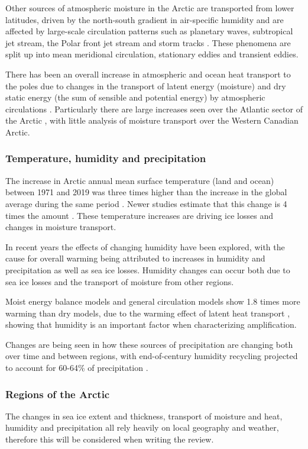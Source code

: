 \documentclass[11pt, oneside]{article}
\begin{document}
Other sources of atmospheric moisture in the Arctic are transported from lower latitudes, driven by the north-south gradient in air-specific humidity and are affected by large-scale circulation patterns such as planetary waves, subtropical jet stream, the Polar front jet stream and storm tracks \cite{gimeno2019atmospheric}. These phenomena are split up into mean meridional circulation, stationary eddies and transient eddies. 

There has been an overall increase in atmospheric and ocean heat transport to the poles due to changes in the transport of latent energy (moisture) and dry static energy (the sum of sensible and potential energy) by atmospheric circulations \cite{mcgraw2020changes}. Particularly there are large increases seen over the Atlantic sector of the Arctic \cite{dufour2016atmospheric}, with little analysis of moisture transport over the Western Canadian Arctic. 

\subsubsection{Temperature, humidity and precipitation} 
The increase in Arctic annual mean surface temperature (land and ocean) between 1971 and 2019 was three times higher than the increase in the global average during the same period \cite{AMAP}. Newer studies estimate that this change is 4 times the amount \cite{rantanen2022arctic}. These temperature increases are driving ice losses and changes in moisture transport.

In recent years the effects of changing humidity have been explored, with the cause for overall warming being attributed to increases in humidity and precipitation \cite{mccrystall2021new} as well as sea ice losses. Humidity changes can occur both due to sea ice losses and the transport of moisture from other regions. 

Moist energy balance models and general circulation models show 1.8 times more warming than dry models, due to the warming effect of latent heat transport \cite{feldl2021polar}, showing that humidity is an important factor when characterizing amplification.

Changes are being seen in how these sources of precipitation are changing both over time and between regions, with end-of-century humidity recycling projected to account for 60-64\% of precipitation \cite{ford2022arctic}.

\subsubsection{Regions of the Arctic }
The changes in sea ice extent and thickness, transport of moisture and heat, humidity and precipitation all rely heavily on local geography and weather, therefore this will be considered when writing the review.





 {}

\end{document}
